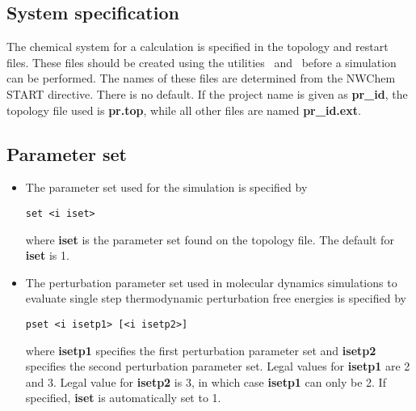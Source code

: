 \subsection{System specification}
The chemical system for a calculation is specified in the topology
and restart files. These files should be created using the utilities
\nwtop\ and \nwrst\ before a simulation can be performed.
The names of these files are determined from the NWChem START directive.
There is no default. If the project name is given as {\bf pr\_id},
the topology file used is {\bf pr.top}, while all other files
are named {\bf pr\_id.ext}.
\subsection{Parameter set}
\begin{itemize}
\item
The parameter set used for the simulation is specified by
\begin{verbatim}
set <i iset>
\end{verbatim}
where {\bf iset} is the parameter set found on the
topology file. The default for {\bf iset} is 1.
\item
The perturbation parameter set used in molecular dynamics simulations
to evaluate single step thermodynamic perturbation free energies is 
specified by
\begin{verbatim}
pset <i isetp1> [<i isetp2>]
\end{verbatim}
where {\bf isetp1} specifies the first perturbation parameter set and
{\bf isetp2} specifies the second perturbation parameter set. Legal
values for {\bf isetp1} are 2 and 3. Legal value for {\bf isetp2} is
3, in which case {\bf isetp1} can only be 2. If specified, {\bf iset}
is automatically set to 1.
\end{itemize}
